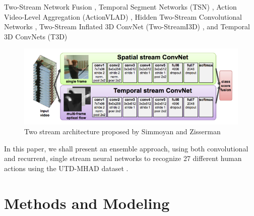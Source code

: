\documentclass[conference]{IEEEtran}
\begin{document}
Two-Stream Network Fusion \cite{FeichtenhoferPZ16}, Temporal Segment Networks (TSN) \cite{WangXW0LTG16},
Action Video-Level Aggregation (ActionVLAD) \cite{GirdharRGSR17},
Hidden Two-Stream Convolutional Networks \cite{ZhuLNH17a},
Two-Stream Inflated 3D ConvNet (Two-StreamI3D) \cite{CarreiraZ17}, and Temporal 3D ConvNets (T3D) \cite{AliMVAMRL} \\ 
\begin{figure}[H]
\includegraphics[scale=0.4]{two_stream_architecture.png}
\caption{\label{fig:twostreamarchi} Two stream architecture proposed by Simmoyan and Zisserman \cite{SimonyanZ14}}
\end{figure}
In this paper, we shall present an ensemble approach, using both convolutional and recurrent, single stream neural networks to recognize 27 different human actions using the UTD-MHAD dataset \cite{UTD-MHAD}. 
\section{Methods and Modeling}
\end{document}
